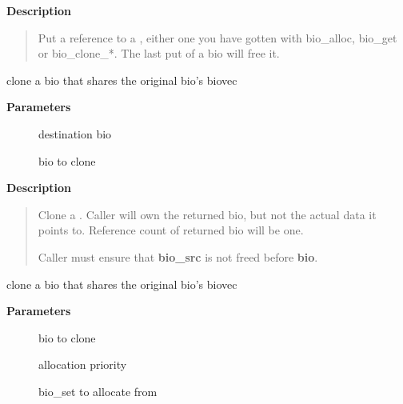 \documentclass[a4paper,8pt,english]{sphinxmanual}
\begin{document}
\textbf{Description}
\begin{quote}

Put a reference to a , either one you have gotten with
bio\_alloc, bio\_get or bio\_clone\_*. The last put of a bio will free it.
\end{quote}

\begin{fulllineitems}
\label{filesystems/index:c.__bio_clone_fast}
clone a bio that shares the original bio's biovec

\end{fulllineitems}


\textbf{Parameters}
\begin{description}
\item[{}] \leavevmode
destination bio

\item[{}] \leavevmode
bio to clone

\end{description}

\textbf{Description}
\begin{quote}

Clone a . Caller will own the returned bio, but not
the actual data it points to. Reference count of returned
bio will be one.

Caller must ensure that \textbf{bio\_src} is not freed before \textbf{bio}.
\end{quote}

\begin{fulllineitems}
\label{filesystems/index:c.bio_clone_fast}
clone a bio that shares the original bio's biovec

\end{fulllineitems}


\textbf{Parameters}
\begin{description}
\item[{}] \leavevmode
bio to clone

\item[{}] \leavevmode
allocation priority

\item[{}] \leavevmode
bio\_set to allocate from

\end{description}
\end{document}
